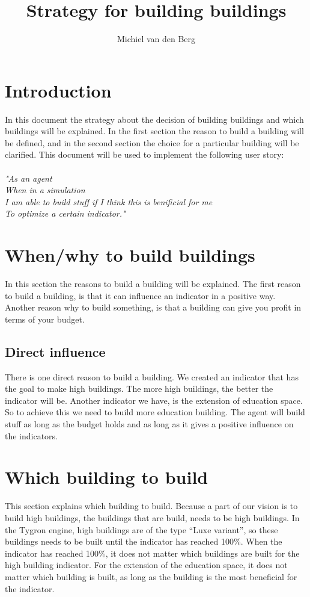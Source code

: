 \documentclass{article}
\author{Michiel van den Berg}
\title{Strategy for building buildings}
\begin{document}

\maketitle{}
\newpage{}

\section{Introduction}

In this document the strategy about the decision of building buildings and which buildings will be explained. In the first section the reason to build a building will be defined, and in the second section the choice for a particular building will be clarified. This document will be used to implement the following user story:\\
\\
\textit{"As an agent\\
When in a simulation\\
I am able to build stuff if I think 
this is benificial for me\\
To optimize a certain indicator."\\}

\section{When/why to build buildings}
In this section the reasons to build a building will be explained. The first reason to build a building, is that it can influence an indicator in a positive way. Another reason why to build something, is that a building can give you profit in terms of your budget.


\subsection{Direct influence}
There is one direct reason to build a building. We created an indicator that has the goal to make high buildings. The more high buildings, the better the indicator will be. Another indicator we have, is the extension of education space. So to achieve this we need to build more education building. The agent will build stuff as long as the budget holds and as long as it gives a positive influence on the indicators.


\section{Which building to build}
This section explains which building to build. Because a part of our vision is to build high buildings, the buildings that are build, needs to be high buildings. In the Tygron engine, high buildings are of the type “Luxe variant”, so these buildings needs to be built until the indicator has reached 100\%. When the indicator has reached 100\%, it does not matter which buildings are built for the high building indicator. For the extension of the education space, it does not matter which building is built, as long as the building is the most beneficial for the indicator. 
\end{document}
